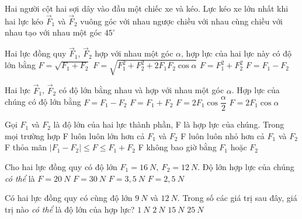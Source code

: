 \begin{ex}%
Hai người cột hai sợi dây vào đầu một chiếc xe và kéo. Lực kéo xe lớn nhất khi hai lực kéo $\overrightarrow{F}_{1}$ và $\overrightarrow{F}_{2}$
\choice
{vuông góc với nhau}
{ngược chiều với nhau}
{\True cùng chiều với nhau}
{tạo với nhau một góc $45^{\circ}$}

\end{ex}
\begin{ex}%
Hai lực đồng quy $\vec{F}_1$, $\vec{F}_2$ hợp với nhau một góc $\alpha$, hợp lực của hai lực này có độ lớn bằng
\choice
{$F=\sqrt {F_1+F_2}$}
{\True $F=\sqrt {F_1^2+F_2^2+2F_1F_2\cos \alpha}$}
{$F=F_1^2+F_2^2$}
{$F=F_1-F_2$}
 \end{ex}
\begin{ex}%
Hai lực $\vec{F}_1$, $\vec{F}_2$ có độ lớn bằng nhau và hợp với nhau một góc $\alpha$. Hợp lực của chúng có độ lớn bằng
\choice
{$F=F_1-F_2$}
{$F=F_1+F_2$}
{\True $F=2F_1\cos\dfrac{\alpha}{2}$}
{$F=2F_1\cos\alpha$}
 \end{ex}
\begin{ex}%
Gọi $F_1$ và $F_2$ là độ lớn của hai lực thành phần, F là hợp lực của chúng. Trong mọi trường hợp
\choice
{F luôn luôn lớn hơn cả $F_1$ và $F_2$}
{F luôn luôn nhỏ hơn cả $F_1$ và $F_2$}
{\True F thỏa mãn $\left|{F_1-F_2}\right|\le F\le F_1+F_2$}
{F không bao giờ bằng $F_1$ hoặc $F_2$}
 \end{ex}
\begin{ex}%
Cho hai lực đồng quy có độ lớn $F_1=16\ N,\ F_2=12\ N$. Độ lớn hợp lực của chúng \textit{có thể} là
\choice
{\True $F=20\ N$}
{$F=30\ N$}
{$F=3,5\ N$}
{$F=2,5\ N$}
 \end{ex}
\begin{ex}%
Có hai lực đồng quy có cùng độ lớn $9\ N$ và $12\ N$. Trong số các giá trị sau đây, giá trị nào \textit{có thể} là độ lớn của hợp lực?
\choice
{$1\ N$}
{$2\ N$}
{\True $15\ N$}
{$25\ N$}
 \end{ex}
